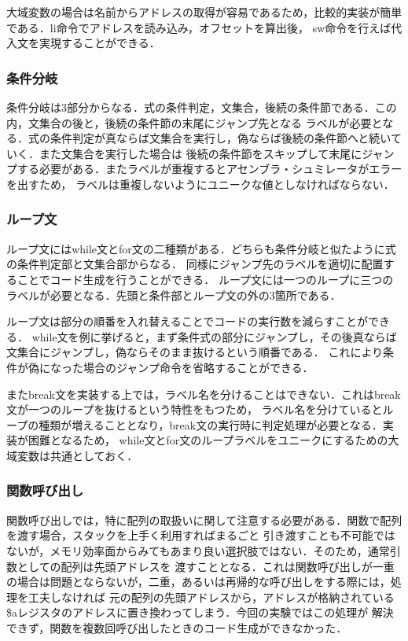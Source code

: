 \documentclass[a4paper,11pt]{jarticle}
\begin{document}
{大域変数の場合は名前からアドレスの取得が容易であるため，比較的実装が簡単である．li命令でアドレスを読み込み，オフセットを算出後，
sw命令を行えば代入文を実現することができる．

\subsubsection{条件分岐}
条件分岐は3部分からなる．式の条件判定，文集合，後続の条件節である．この内，文集合の後と，後続の条件節の末尾にジャンプ先となる
ラベルが必要となる．式の条件判定が真ならば文集合を実行し，偽ならば後続の条件節へと続いていく．また文集合を実行した場合は
後続の条件節をスキップして末尾にジャンプする必要がある．またラベルが重複するとアセンブラ・シュミレータがエラーを出すため，
ラベルは重複しないようにユニークな値としなければならない．

\subsubsection{ループ文}
ループ文にはwhile文とfor文の二種類がある．どちらも条件分岐と似たように式の条件判定部と文集合部からなる．
同様にジャンプ先のラベルを適切に配置することでコード生成を行うことができる．
ループ文には一つのループに三つのラベルが必要となる．先頭と条件部とループ文の外の3箇所である．

ループ文は部分の順番を入れ替えることでコードの実行数を減らすことができる．
while文を例に挙げると，まず条件式の部分にジャンプし，その後真ならば文集合にジャンプし，偽ならそのまま抜けるという順番である．
これにより条件が偽になった場合のジャンプ命令を省略することができる．

またbreak文を実装する上では，ラベル名を分けることはできない．これはbreak文が一つのループを抜けるという特性をもつため，
ラベル名を分けているとループの種類が増えることとなり，break文の実行時に判定処理が必要となる．実装が困難となるため，
while文とfor文のループラベルをユニークにするための大域変数は共通としておく．

\subsubsection{関数呼び出し}
関数呼び出しでは，特に配列の取扱いに関して注意する必要がある．関数で配列を渡す場合，スタックを上手く利用すればまるごと
引き渡すことも不可能ではないが，メモリ効率面からみてもあまり良い選択肢ではない．そのため，通常引数としての配列は先頭アドレスを
渡すこととなる．これは関数呼び出しが一重の場合は問題とならないが，二重，あるいは再帰的な呼び出しをする際には，処理を工夫しなければ
元の配列の先頭アドレスから，アドレスが格納されている\$aレジスタのアドレスに置き換わってしまう．今回の実験ではこの処理が
解決できず，関数を複数回呼び出したときのコード生成ができなかった．



}
\end{document}

